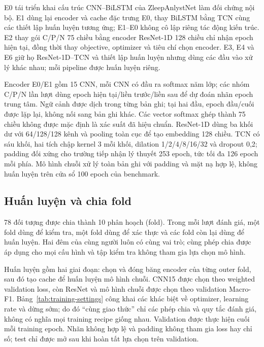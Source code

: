 \documentclass[10pt,a4paper]{article}
\begin{document}
E0 tái triển khai cấu trúc CNN--BiLSTM của ZleepAnlystNet làm đối chứng nội bộ. E1 dùng lại encoder và cache đặc trưng E0, thay BiLSTM bằng TCN cùng các thiết lập huấn luyện tương ứng; E1--E0 không cô lập riêng tác động kiến trúc. E2 thay gói C/P/N 75 chiều bằng encoder ResNet-1D 128 chiều chỉ nhận epoch hiện tại, đồng thời thay objective, optimizer và tiêu chí chọn encoder. E3, E4 và E6 giữ họ ResNet-1D--TCN và thiết lập huấn luyện nhưng dùng các đầu vào xử lý khác nhau; mỗi pipeline được huấn luyện riêng.

Encoder E0/E1 gồm 15 CNN, mỗi CNN có đầu ra softmax năm lớp; các nhóm C/P/N lần lượt dùng epoch hiện tại/liền trước/liền sau để dự đoán nhãn epoch trung tâm. Ngữ cảnh được dịch trong từng bản ghi; tại hai đầu, epoch đầu/cuối được lặp lại, không nối sang bản ghi khác. Các vector softmax ghép thành 75 chiều không được mặc định là xác suất đã hiệu chuẩn. ResNet-1D dùng ba khối dư với 64/128/128 kênh và pooling toàn cục để tạo embedding 128 chiều. TCN có sáu khối, hai tích chập kernel 3 mỗi khối, dilation 1/2/4/8/16/32 và dropout 0,2; padding đối xứng cho trường tiếp nhận lý thuyết 253 epoch, tức tối đa 126 epoch mỗi phía. Mô hình chuỗi xử lý toàn bản ghi với padding và mặt nạ hợp lệ, không huấn luyện trên cửa sổ 100 epoch của benchmark.

\subsection{Huấn luyện và chia fold}

78 đối tượng được chia thành 10 phân hoạch (fold). Trong mỗi lượt đánh giá, một fold dùng để kiểm tra, một fold dùng để xác thực và các fold còn lại dùng để huấn luyện. Hai đêm của cùng người luôn có cùng vai trò; cùng phép chia được áp dụng cho mọi cấu hình và tập kiểm tra không tham gia lựa chọn mô hình.

Huấn luyện gồm hai giai đoạn: chọn và đóng băng encoder của từng outer fold, sau đó tạo cache để huấn luyện mô hình chuỗi. CNN15 được chọn theo weighted validation loss, còn ResNet và mô hình chuỗi được chọn theo validation Macro-F1. Bảng~\ref{tab:training-settings} công khai các khác biệt về optimizer, learning rate và dừng sớm; do đó ``cùng giao thức'' chỉ các phép chia và quy tắc đánh giá, không có nghĩa mọi training recipe giống nhau. Validation được thực hiện cuối mỗi training epoch. Nhãn không hợp lệ và padding không tham gia loss hay chỉ số; test chỉ được mở sau khi hoàn tất lựa chọn trên validation.
\end{document}

